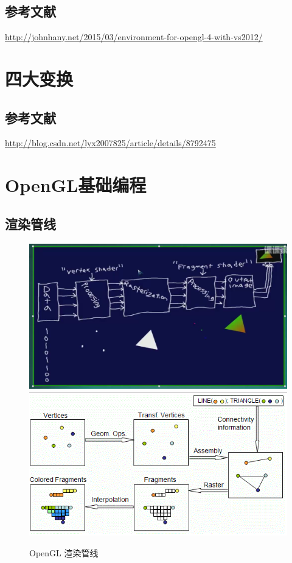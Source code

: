 \documentclass[UTF8,a4paper,8pt]{ctexart}
\begin{document}
    \subsection{参考文献} 
    \url{http://johnhany.net/2015/03/environment-for-opengl-4-with-vs2012/}    
    
\newpage
\section{四大变换}


    \subsection{参考文献} 
		 \url{http://blog.csdn.net/lyx2007825/article/details/8792475}
 
    
\newpage
\section{OpenGL基础编程}
	\subsection{渲染管线}
		\begin{figure}[h]
			\centering
			\includegraphics[scale = 0.4]{OpenGLPipeline.png}
			\includegraphics[scale = 0.8]{OpenGLPipeline1.png}
			\caption{OpenGL 渲染管线}
		\end{figure}
\end{document}
